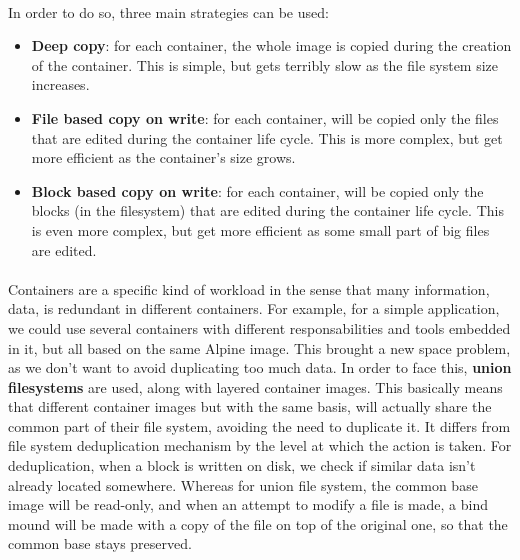 \paragraph{}In order to do so, three main strategies can be used:
\begin{itemize}
\renewcommand\labelitemi{--}
  \item \textbf{Deep copy}: for each container, the whole image is copied during the creation of the container.  This is simple, but gets terribly slow as the file system size increases.
  \item \textbf{File based copy on write}: for each container, will be copied only the files that are edited during the container life cycle.  This is more complex, but get more efficient as the container's size grows.
  \item \textbf{Block based copy on write}: for each container, will be copied only the blocks (in the filesystem) that are edited during the container life cycle.  This is even more complex, but get more efficient as some small part of big files are edited.
\end{itemize}

\paragraph{}Containers are a specific kind of workload in the sense that many information, data, is redundant in different containers.  For example, for a simple application, we could use several containers with different responsabilities and tools embedded in it, but all based on the same Alpine image.  This brought a new space problem, as we don't want to avoid duplicating too much data.  In order to face this, \textbf{union filesystems} are used, along with layered container images.  This basically means that different container images but with the same basis, will actually share the common part of their file system, avoiding the need to duplicate it.  It differs from file system deduplication mechanism by the level at which the action is taken.  For deduplication, when a block is written on disk, we check if similar data isn't already located somewhere.  Whereas for union file system, the common base image will be read-only, and when an attempt to modify a file is made, a bind mound will be made with a copy of the file on top of the original one, so that the common base stays preserved.

